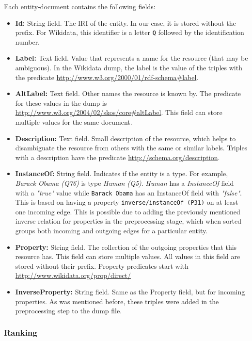 Each entity-document contains the following fields:
\begin{itemize}
    \item \textbf{Id:} String field. The IRI of the entity. In our case, it is stored without the prefix. For Wikidata, this identifier is a letter \texttt{Q} followed by the identification number.
    \item \textbf{Label:} Text field.  Value that represents a name for the resource (that may be ambiguous).  In the Wikidata dump, the label is the value of the triples with the predicate \url{http://www.w3.org/2000/01/rdf-schema#label}. 
    \item \textbf{AltLabel:} Text field. Other names the resource is known by.  The predicate for these values in the dump is \url{http://www.w3.org/2004/02/skos/core#altLabel}. This field can store multiple values for the same document.
    \item \textbf{Description:} Text field. Small description of the resource, which helps to disambiguate the resource from others with the same or similar labels. Triples with a description have the predicate \url{http://schema.org/description}.
    \item \textbf{InstanceOf:} String field. Indicates if the entity is a type. For example, \textit{Barack Obama (Q76)} is type \textit{Human (Q5)}. \textit{Human} has a \textit{InstanceOf} field with a \textit{"true"} value while \texttt{Barack Obama} has an InstanceOf field with \textit{"false"}. This is based on having a property \texttt{inverse/instanceOf (P31)} on at least one incoming edge. This is possible due to adding the previously mentioned inverse relation for properties in the preprocessing stage, which when sorted groups both incoming and outgoing edges for a particular entity.
    \item \textbf{Property:} String field. The collection of the outgoing properties that this resource has. This field can store multiple values. All values in this field are stored without their prefix. Property predicates start with  \url{http://www.wikidata.org/prop/direct/}
    \item \textbf{InverseProperty:} String field. Same as the Property field, but for incoming properties. As was mentioned before, these triples were added in the preprocessing step to the dump file.
\end{itemize}

\subsubsection{Ranking}

